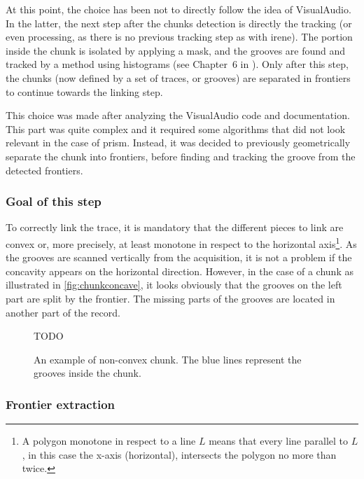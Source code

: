 At this point, the choice has been not to directly follow the idea of VisualAudio. In the latter, the next step after the chunks detection is directly the tracking (or even processing, as there is no previous tracking step as with \gls{irene}). The portion inside the chunk is isolated by applying a mask, and the grooves are found and tracked by a method using histograms (see Chapter~6 in \cite{seydoux08}). Only after this step, the chunks (now defined by a set of traces, or grooves) are separated in frontiers to continue towards the linking step.

This choice was made after analyzing the VisualAudio code and documentation. This part was quite complex and it required some algorithms that did not look relevant in the case of \gls{prism}. Instead, it was decided to previously geometrically separate the chunk into frontiers, before finding and tracking the groove from the detected frontiers.

\subsubsection{Goal of this step}
\label{chap:linking}


To correctly link the trace, it is mandatory that the different pieces to link are convex or, more precisely, at least monotone in respect to the horizontal axis\footnote{A polygon monotone in respect to a line $L$ means that every line parallel to $L$, in this case the x-axis (horizontal), intersects the polygon no more than twice.}. As the grooves are scanned vertically from the acquisition, it is not a problem if the concavity appears on the horizontal direction. However, in the case of a chunk as illustrated in \autoref{fig:chunkconcave}, it looks obviously that the grooves on the left part are split by the frontier. The missing parts of the grooves are located in another part of the record.

\begin{figure}[!ht]
\centering
TODO
\caption[An example of non-convex chunk.]
{An example of non-convex chunk. The blue lines represent the grooves inside the chunk.}
\label{fig:chunkconcave}
\end{figure}

\subsubsection{Frontier extraction}

